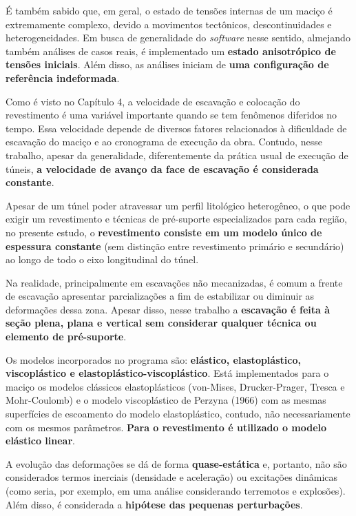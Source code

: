 É também sabido que, em geral, o estado de tensões internas de um maciço é extremamente complexo, devido a movimentos tectônicos, descontinuidades e heterogeneidades. Em busca de generalidade do \textit{software} nesse sentido, almejando também análises de casos reais, é implementado um \textbf{estado anisotrópico de tensões iniciais}. Além disso, as análises iniciam de \textbf{uma configuração de referência indeformada}.

Como é visto no Capítulo 4, a velocidade de escavação e colocação do revestimento é uma variável importante quando se tem fenômenos diferidos no tempo. Essa velocidade depende de diversos fatores relacionados à dificuldade de escavação do maciço e ao cronograma de execução da obra. Contudo, nesse trabalho, apesar da generalidade, diferentemente da prática usual de execução de túneis, \textbf{a velocidade de avanço da face de escavação é considerada constante}.

Apesar de um túnel poder atravessar um perfil litológico heterogêneo, o que pode exigir um revestimento e técnicas de pré-suporte especializados para cada região, no presente estudo, o \textbf{revestimento consiste em um modelo único de espessura constante} (sem distinção entre revestimento primário e secundário) ao longo de todo o eixo longitudinal do túnel.

Na realidade, principalmente em escavações não mecanizadas, é comum a frente de escavação apresentar parcializações a fim de estabilizar ou diminuir as deformações dessa zona. Apesar disso, nesse trabalho a \textbf{escavação é feita à seção plena, plana e vertical sem considerar qualquer técnica ou elemento de pré-suporte}.

Os modelos incorporados no programa são: \textbf{elástico, elastoplástico, viscoplástico e elastoplástico-viscoplástico}. Está implementados para o maciço os modelos clássicos elastoplásticos (von-Mises, Drucker-Prager, Tresca e Mohr-Coulomb) e o modelo viscoplástico de Perzyna (1966) com as mesmas superfícies de escoamento do modelo elastoplástico, contudo, não necessariamente com os mesmos parâmetros. \textbf{Para o revestimento é utilizado o modelo elástico linear}.

A evolução das deformações se dá de forma \textbf{quase-estática} e, portanto, não são considerados termos inerciais (densidade e aceleração) ou excitações dinâmicas (como seria, por exemplo, em uma análise considerando terremotos e explosões). Além disso, é considerada a \textbf{hipótese das pequenas perturbações}.

